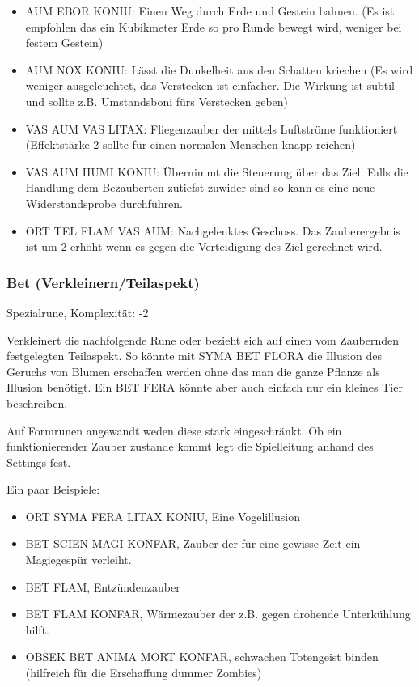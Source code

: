 \documentclass{article}
\begin{document}
\begin{itemize}
\item AUM EBOR KONIU: Einen Weg durch Erde und Gestein bahnen. (Es ist empfohlen das ein Kubikmeter Erde so pro Runde bewegt wird, weniger bei festem Gestein)
\item AUM NOX KONIU: Lässt die Dunkelheit aus den Schatten kriechen (Es wird weniger ausgeleuchtet, das Verstecken ist einfacher. Die Wirkung ist subtil und sollte z.B. Umstandsboni fürs Verstecken geben)
\item VAS AUM VAS LITAX: Fliegenzauber der mittels Luftströme funktioniert (Effektstärke 2 sollte für einen normalen Menschen knapp reichen)
\item VAS AUM HUMI KONIU: Übernimmt die Steuerung über das Ziel. Falls die Handlung dem Bezauberten zutiefst zuwider sind so kann es eine neue Widerstandsprobe durchführen.
\item ORT TEL FLAM VAS AUM: Nachgelenktes Geschoss. Das Zauberergebnis ist um 2 erhöht wenn es gegen die Verteidigung des Ziel gerechnet wird.
\end{itemize}

\subsubsection{Bet (Verkleinern/Teilaspekt)}

Spezialrune, Komplexität: -2

Verkleinert die nachfolgende Rune oder bezieht sich auf einen vom Zaubernden festgelegten Teilaspekt. So könnte mit
SYMA BET FLORA die Illusion des Geruchs von Blumen erschaffen werden ohne das man die ganze Pflanze als Illusion
benötigt. Ein BET FERA könnte aber auch einfach nur ein kleines Tier beschreiben.

Auf Formrunen angewandt weden diese stark eingeschränkt. Ob ein funktionierender Zauber zustande kommt legt die
Spielleitung anhand des Settings fest.

Ein paar Beispiele:

\begin{itemize}
\item ORT SYMA FERA LITAX KONIU, Eine Vogelillusion
\item BET SCIEN MAGI KONFAR, Zauber der für eine gewisse Zeit ein Magiegespür verleiht.
\item BET FLAM, Entzündenzauber
\item BET FLAM KONFAR, Wärmezauber der z.B. gegen drohende Unterkühlung hilft.
\item OBSEK BET ANIMA MORT KONFAR, schwachen Totengeist binden (hilfreich für die Erschaffung dummer Zombies)
\end{itemize}
\end{document}
